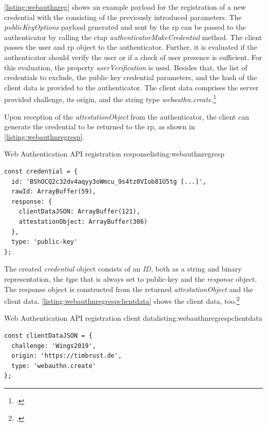 \autoref{listing:webauthnreg} shows an example payload for the registration of a new credential with the \wa{} consisting of the previously introduced parameters. The \textit{publicKeyOptions} payload generated and sent by the \gls{rp} can be passed to the authenticator by calling the \gls{ctap} \textit{authenticatorMakeCredential} method. The client passes the user and \gls{rp} object to the authenticator. Further, it is evaluated if the authenticator should verify the user or if a check of user presence is sufficient. For this evaluation, the property \textit{userVerification} is used. Besides that, the list of credentials to exclude, the public key credential parameters, and the hash of the client data is provided to the authenticator. The client data comprises the server provided challenge, its origin, and the string type \textit{webauthn.create}.\footcites[See][Chapter 5.4, 6.4.2]{w3c}

Upon reception of the \textit{attestationObject} from the authenticator, the client can generate the credential to be returned to the \gls{rp}, as shown in \autoref{listing:webauthnregresp}.
\\
\begin{example}{Web Authentication API registration response}{listing:webauthnregresp}
\begin{verbatim}
const credential = {
  id: 'BShOCQ2c32dv4aqyy3oWmcu_9s4tz0VIob81U5tg [...]',
  rawId: ArrayBuffer(59),
  response: {
    clientDataJSON: ArrayBuffer(121),
    attestationObject: ArrayBuffer(306)
  },
  type: 'public-key'
};
\end{verbatim}
\end{example}

The created \textit{credential} object consists of an \textit{ID}, both as a string and binary representation, the \textit{type} that is always set to \frqq public-key\flqq{} and the \textit{response} object. The response object is constructed from the returned \textit{attestationObject} and the client data. \autoref{listing:webauthnregrespclientdata} shows the client data, too.\footcite[See][Chapter 5.1]{w3c}
\\
\begin{example}{Web Authentication API registration client data}{listing:webauthnregrespclientdata}
\begin{verbatim}
const clientDataJSON = {
  challenge: 'Wings2019',
  origin: 'https://timbrust.de',
  type: 'webauthn.create'
};
\end{verbatim}
\end{example}

